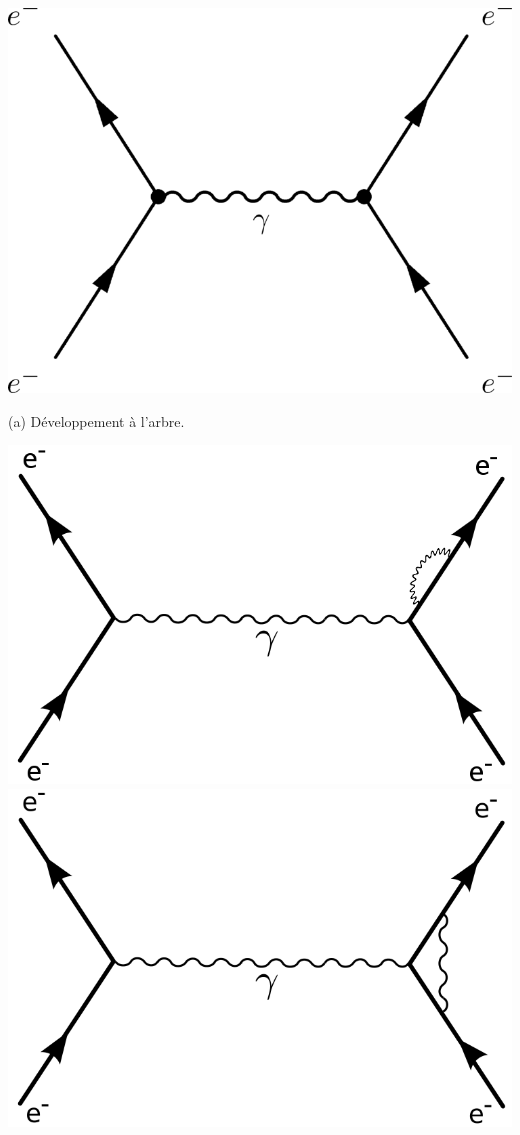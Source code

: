 {
\begin{center}
\includegraphics[width=\marginparwidth]{SM/feyn0.png}
\begin{center}\normalfont\small {(a) Développement à l'arbre.}\end{center}
\includegraphics[width=\marginparwidth]{SM/feyn1.png}
\includegraphics[width=\marginparwidth]{SM/feyn2.png}

\end{center}}
